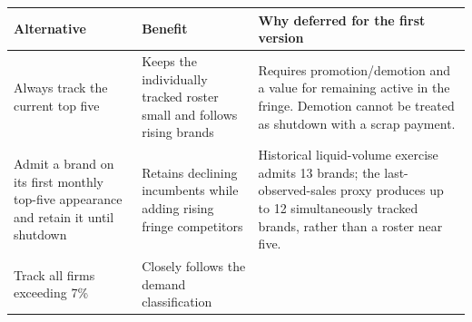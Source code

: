 \documentclass[10pt,]{article}
\begin{document}
\begin{longtable}[]{@{}lll@{}}
\toprule
\begin{minipage}[b]{0.18\columnwidth}\raggedright\strut
Alternative\strut
\end{minipage} & \begin{minipage}[b]{0.13\columnwidth}\raggedright\strut
Benefit\strut
\end{minipage} & \begin{minipage}[b]{0.47\columnwidth}\raggedright\strut
Why deferred for the first version\strut
\end{minipage}\tabularnewline
\midrule
\endhead
\begin{minipage}[t]{0.18\columnwidth}\raggedright\strut
Always track the current top five\strut
\end{minipage} & \begin{minipage}[t]{0.13\columnwidth}\raggedright\strut
Keeps the individually tracked roster small and follows rising
brands\strut
\end{minipage} & \begin{minipage}[t]{0.47\columnwidth}\raggedright\strut
Requires promotion/demotion and a value for remaining active in the
fringe. Demotion cannot be treated as shutdown with a scrap
payment.\strut
\end{minipage}\tabularnewline
\begin{minipage}[t]{0.18\columnwidth}\raggedright\strut
Admit a brand on its first monthly top-five appearance and retain it
until shutdown\strut
\end{minipage} & \begin{minipage}[t]{0.13\columnwidth}\raggedright\strut
Retains declining incumbents while adding rising fringe
competitors\strut
\end{minipage} & \begin{minipage}[t]{0.47\columnwidth}\raggedright\strut
Historical liquid-volume exercise admits 13 brands; the
last-observed-sales proxy produces up to 12 simultaneously tracked
brands, rather than a roster near five.\strut
\end{minipage}\tabularnewline
\begin{minipage}[t]{0.18\columnwidth}\raggedright\strut
Track all firms exceeding 7\%\strut
\end{minipage} & \begin{minipage}[t]{0.13\columnwidth}\raggedright\strut
Closely follows the demand classification\strut
\end{minipage} & \begin{minipage}[t]{0.47\columnwidth}\raggedright\strut

\end{minipage}
\end{longtable}
\end{document}
